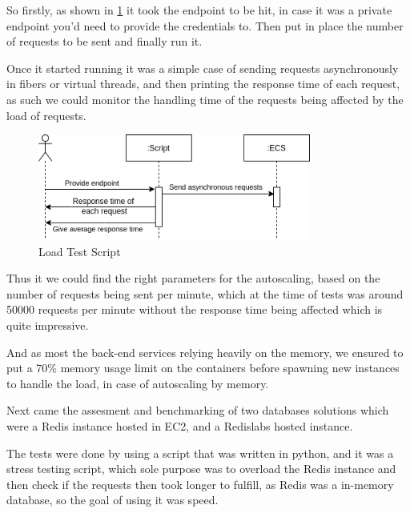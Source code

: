 So firstly, as shown in \ref{fig:loadtest} it took the endpoint to be hit, in case
it was a private endpoint you'd need to provide the credentials to. Then put in place
the number of requests to be sent and finally run it.

Once it started running it was a simple case of sending requests asynchronously in fibers
or virtual threads, and then printing the response time of each request, as such we could
monitor the handling time of the requests being affected by the load of requests.

\begin{figure}[!ht]
    \centering
    \includegraphics[width=0.8\textwidth]{images/scriptdos.png}
    \caption{Load Test Script}
    \label{fig:loadtest}
\end{figure}


Thus it we could find the right parameters for the autoscaling, based on the number of
requests being sent per minute, which at the time of tests was around 50000 requests per
minute without the response time being affected which is quite impressive.

And as most the back-end services relying heavily on the memory, we ensured to put a 70\%
memory usage limit on the containers before spawning new instances to handle the load, in
case of autoscaling by memory.

Next came the assesment and benchmarking of two databases solutions which were a Redis
instance hosted in EC2, and a Redislabs hosted instance.

The tests were done by using a script that was written in python, and it was a
stress testing script, which sole purpose was to overload the Redis instance 
and then check if the requests then took longer to fulfill, as Redis was a in-memory
database, so the goal of using it was speed.

